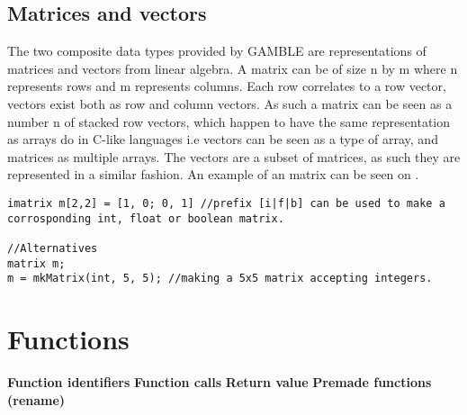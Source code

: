 \subsection{Matrices and vectors}
The two composite data types provided by GAMBLE are representations of matrices and vectors from linear algebra.
A matrix can be of size n by m where n represents rows and m represents columns.
Each row correlates to a row vector, vectors exist both as row and column vectors.
As such a matrix can be seen as a number n of stacked row vectors, which happen to have the same representation as arrays do in C-like languages i.e vectors can be seen as a type of array, and matrices as multiple arrays.
The vectors are a subset of matrices, as such they are represented in a similar fashion.
An example of an matrix can be seen on .

\begin{lstlisting}[caption={Creating a matrix},label={lst:matrix}]
imatrix m[2,2] = [1, 0; 0, 1] //prefix [i|f|b] can be used to make a corrosponding int, float or boolean matrix.

//Alternatives
matrix m;
m = mkMatrix(int, 5, 5); //making a 5x5 matrix accepting integers.
\end{lstlisting}


\section{Functions}
\textbf{Function identifiers}
\textbf{Function calls}
\textbf{Return value}
\textbf{Premade functions (rename)}


%


